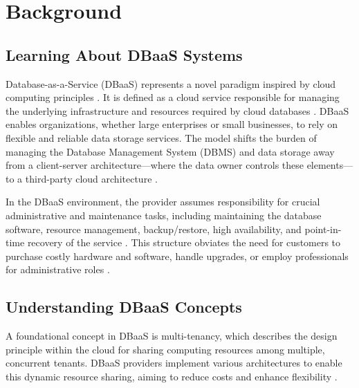 \section{Background}
\subsection{Learning About DBaaS Systems}
Database-as-a-Service (DBaaS) represents a novel paradigm inspired by cloud computing principles \cite{Comparison_of_dbaas_architectures}. It is defined as a cloud service responsible for managing the underlying infrastructure and resources required by cloud databases \cite{Impact_of_Performance_Metrics_on_Database_Speedup_in_DBaaS}. DBaaS enables organizations, whether large enterprises or small businesses, to rely on flexible and reliable data storage services. The model shifts the burden of managing the Database Management System (DBMS) and data storage away from a client-server architecture—where the data owner controls these elements—to a third-party cloud architecture \cite{Impact_of_Performance_Metrics_on_Database_Speedup_in_DBaaS}.

In the DBaaS environment, the provider assumes responsibility for crucial administrative and maintenance tasks, including maintaining the database software, resource management, backup/restore, high availability, and point-in-time recovery of the service \cite{Solver_in_the_loop_cluster_resource_management_for_DBaaS}. This structure obviates the need for customers to purchase costly hardware and software, handle upgrades, or employ professionals for administrative roles \cite{Comparison_of_dbaas_architectures}.

\subsection{Understanding DBaaS Concepts}
A foundational concept in DBaaS is multi-tenancy, which describes the design principle within the cloud for sharing computing resources among multiple, concurrent tenants. DBaaS providers implement various architectures to enable this dynamic resource sharing, aiming to reduce costs and enhance flexibility \cite{Comparison_of_dbaas_architectures}.

